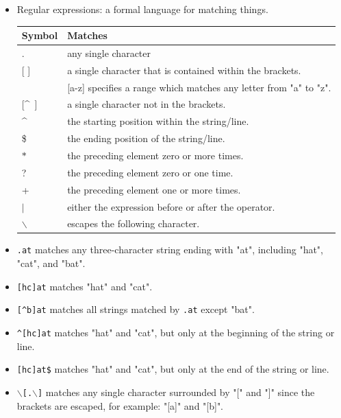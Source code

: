 \documentclass[a4paper,landscape,headrule,footrule,xetex]{foils}
\begin{document}
\begin{itemize}
\item Regular expressions: a formal language for matching things.
\\[2ex]
  \begin{tabular}{ll}
    Symbol & Matches \\ \hline
    . & any single character\\
    {[ ]} & a single character that is contained within the brackets. \\
    & {[a-z]} specifies a range which matches any  letter from "a" to "z".\\
    {[\textasciicircum ~]} & 	a single character not in the brackets. \\
    \textasciicircum 	& the starting position within the string/line. \\
    \$ 	&  the ending position of the string/line. \\
    $*$ &	the preceding element zero or more times. \\
    ? &	 the preceding element zero or one time. \\
    + &	 the preceding element one or more times. \\
    $|$ &  either the expression before or after the operator. \\
    $\backslash$ & escapes the following character. \\
  \end{tabular}

\end{itemize}

\begin{itemize}
\item  \texttt{.at} matches any three-character string ending with "at", including "hat", "cat", and "bat".
\item \texttt{[hc]at} matches "hat" and "cat".
\item \texttt{[\textasciicircum{}b]at} matches all strings matched by \texttt{.at} except "bat".
\item \texttt{\textasciicircum{}[hc]at} matches "hat" and "cat", but only at the beginning of the string or line.
\item \texttt{[hc]at\$} matches "hat" and "cat", but only at the end of the string or line.
\item \texttt{$\backslash$[.$\backslash$]} matches any single character surrounded by "[" and "]" since the brackets are escaped, for example: "[a]" and "[b]".
\end{itemize}
\end{document}
